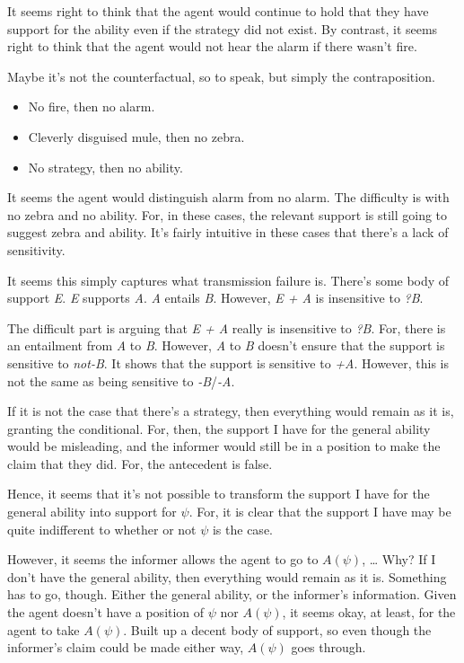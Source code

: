\documentclass[10pt]{article}
\begin{document}
\begin{note}[Counterfactual]
  It seems right to think that the agent would continue to hold that they have support for the ability even if the strategy did not exist.
  By contrast, it seems right to think that the agent would not hear the alarm if there wasn't fire.

  Maybe it's not the counterfactual, so to speak, but simply the contraposition.
  \begin{itemize}
  \item No fire, then no alarm.
  \item Cleverly disguised mule, then no zebra.
  \item No strategy, then no ability.
  \end{itemize}
  It seems the agent would distinguish alarm from no alarm.
  The difficulty is with no zebra and no ability.
  For, in these cases, the relevant support is still going to suggest zebra and ability.
  It's fairly intuitive in these cases that there's a lack of sensitivity.
\end{note}

\begin{note}[Obvious?]
  It seems this simply captures what transmission failure is.
  There's some body of support \emph{E}.
  \emph{E} supports \emph{A}.
  \emph{A} entails \emph{B}.
  However, \emph{E + A} is insensitive to \emph{?B}.

  The difficult part is arguing that \emph{E + A} really is insensitive to \emph{?B}.
  For, there is an entailment from \emph{A} to \emph{B}.
  However, \emph{A} to \emph{B} doesn't ensure that the support is sensitive to \emph{not-B}.
  It shows that the support is sensitive to \emph{+A}.
  However, this is not the same as being sensitive to \emph{-B}/\emph{-A}.

  If it is not the case that there's a strategy, then everything would remain as it is, granting the conditional.
  For, then, the support I have for the general ability would be misleading, and the informer would still be in a position to make the claim that they did.
  For, the antecedent is false.

  Hence, it seems that it's not possible to transform the support I have for the general ability into support for \(\psi\).
  For, it is clear that the support I have may be quite indifferent to whether or not \(\psi\) is the case.

  However, it seems the informer allows the agent to go to \(A(\psi)\), \dots
  Why?
  If I don't have the general ability, then everything would remain as it is.
  Something has to go, though.
  Either the general ability, or the informer's information.
  Given the agent doesn't have a position of \(\psi\) nor \(A(\psi)\), it seems okay, at least, for the agent to take \(A(\psi)\).
  Built up a decent body of support, so even though the informer's claim could be made either way, \(A(\psi)\) goes through.
\end{note}
\end{document}
